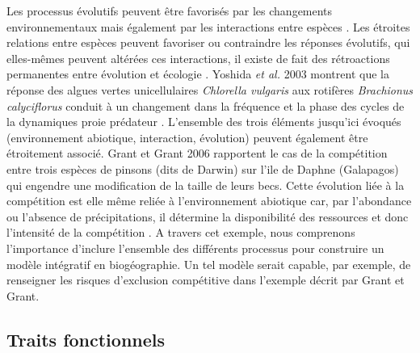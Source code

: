 Les processus évolutifs peuvent être favorisés par les changements
environnementaux mais également par les interactions entre espèces
\cite{Tingley2009}. Les étroites relations entre espèces peuvent
favoriser ou contraindre les réponses évolutifs, qui elles-mêmes peuvent
altérées ces interactions, il existe de fait des rétroactions
permanentes entre évolution et écologie \cite{Post2009}. Yoshida
\textit{et al.} 2003 montrent que la réponse des algues vertes
unicellulaires \textit{Chlorella vulgaris} aux rotifères
\textit{Brachionus calyciflorus} conduit à un changement dans la
fréquence et la phase des cycles de la dynamiques proie prédateur
\cite{Yoshida2003}. L'ensemble des trois éléments jusqu'ici évoqués
(environnement abiotique, interaction, évolution) peuvent également être
étroitement associé. Grant et Grant 2006 rapportent le cas de la
compétition entre trois espèces de pinsons (dits de Darwin) sur l'ile de
Daphne (Galapagos) qui engendre une modification de la taille de leurs
becs. Cette évolution liée à la compétition est elle même reliée à
l'environnement abiotique car, par l'abondance ou l'absence de
précipitations, il détermine la disponibilité des ressources et donc
l'intensité de la compétition \cite{Grant2006}. A travers cet exemple,
nous comprenons l'importance d'inclure l'ensemble des différents
processus pour construire un modèle intégratif en biogéographie. Un tel
modèle serait capable, par exemple, de renseigner les risques
d'exclusion compétitive dans l'exemple décrit par Grant et Grant.

\subsection{Traits fonctionnels}

